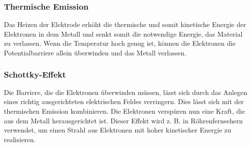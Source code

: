 \subsubsection{Thermische Emission}
Das Heizen der Elektrode erhöht die thermische und somit kinetische Energie der Elektronen in dem Metall und senkt somit die notwendige Energie, das Material zu verlassen. Wenn die Temperatur hoch genug ist, können die Elektronen die Potentialbarriere allein überwinden und das Metall verlassen.
\subsubsection{Schottky-Effekt}
Die Barriere, die die Elektronen überwinden müssen, lässt sich durch das Anlegen eines richtig ausgerichteten elektrischen Feldes verringern. Dies lässt sich mit der thermischen Emission kombinieren. Die Elektronen verspüren nun eine Kraft, die aus dem Metall herausgerichtet ist. Dieser Effekt wird z. B. in Röhrenfernsehern verwendet, um einen Strahl aus Elektronen mit hoher kinetischer Energie zu realisieren. \cite{cooray2014}
